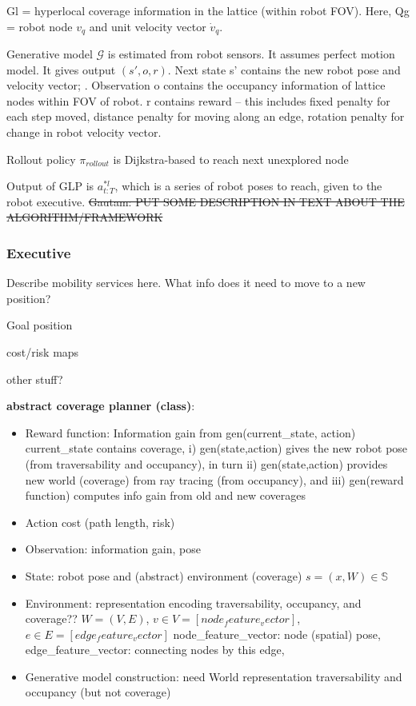 \documentclass{article}
\newcommand{\ph}[1]{{\textbf{#1}:}} %
\newcommand{\gautam}[1]{{\color{cyan}Gautam: #1 }}
\begin{document}
Gl = hyperlocal coverage information in the lattice (within robot FOV). Here, Qg = robot node $v_q$  and unit velocity vector $\dot{v}_q$. 

Generative model $\mathcal{G}$ is estimated from robot sensors. It assumes perfect motion model. It gives output $(s', o, r)$. Next state s' contains the new robot pose and velocity vector; . Observation o contains the occupancy information of lattice nodes within FOV of robot. r contains reward -- this includes fixed penalty for each step moved, distance penalty for moving along an edge, rotation penalty for change in robot velocity vector.

Rollout policy $\pi_{rollout}$ is Dijkstra-based to reach next unexplored node

Output of GLP is $a^{*l}_{t:T}$, which is a series of robot poses to reach, given to the robot executive.
\sout{\gautam{PUT SOME DESCRIPTION IN TEXT ABOUT THE ALGORITHM/FRAMEWORK}}

\subsubsection{Executive}
Describe mobility services here. What info does it need to move to a new position?

Goal position

cost/risk maps

other stuff?










\ph{abstract coverage planner (class)}

\begin{itemize}
    \item Reward function: Information gain from gen(current\_state, action)
    current\_state contains coverage, i) gen(state,action) gives the new robot pose (from traversability and occupancy), in turn ii) gen(state,action) provides new world (coverage) from ray tracing (from occupancy), and iii) gen(reward function) computes info gain from old and new coverages
    \item Action cost (path length, risk)
    \item Observation: information gain, pose
    \item State: robot pose and (abstract) environment (coverage)
    $s = (x, W) \in \mathbb{S}$
    \item Environment: representation encoding traversability, occupancy, and coverage??
    $W = (V, E)$, $v \in V = [node_feature_vector]$, $e \in E = [edge_feature_vector]$
    node\_feature\_vector: node (spatial) pose, 
    edge\_feature\_vector: connecting nodes by this edge, 
    \item Generative model construction: need World representation traversability and occupancy (but not coverage)
\end{itemize}
\end{document}
